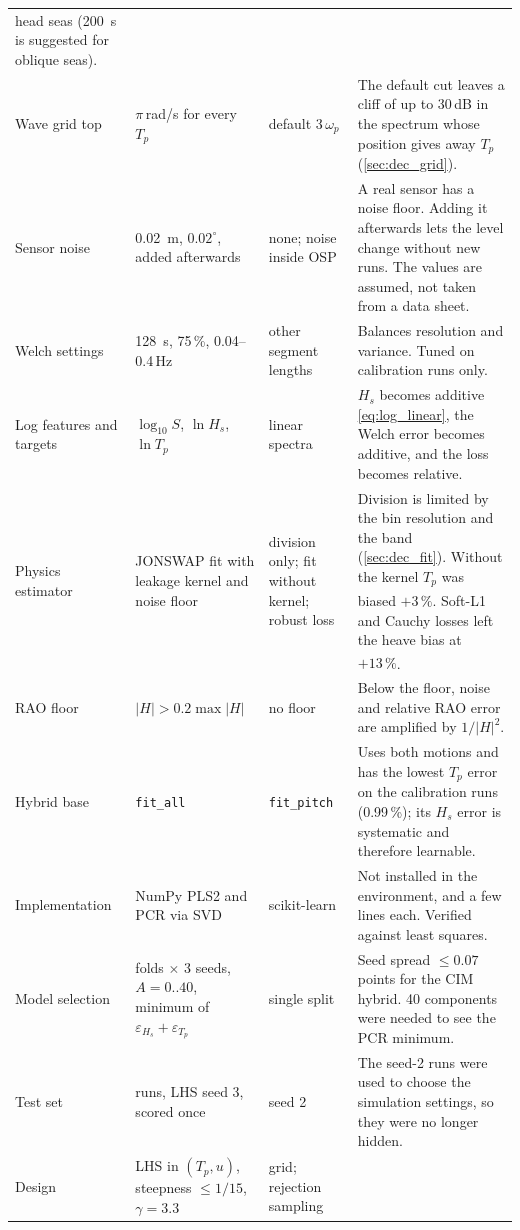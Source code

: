 \documentclass[11pt,a4paper]{article}
\newcommand{\Hs}{H_{s}}
\newcommand{\Tp}{T_{p}}
\newcommand{\pct}[1]{#1\,\%}
\newcommand{\dagnote}{\textsuperscript{\dag}}
\begin{document}
{\begin{longtable}{@{}>{\raggedright\arraybackslash}p{2.5cm}>{\raggedright\arraybackslash}p{3.4cm}>{\raggedright\arraybackslash}p{2.6cm}>{\raggedright\arraybackslash}p{6.4cm}@{}}
    head seas (\SI{200}{s} is suggested for oblique seas). \\
  Wave grid top & $\pi$\,rad/s for every $\Tp$ & default $3\,\omega_p$ &
    The default cut leaves a cliff of up to 30\,dB in the spectrum whose position gives away
    $\Tp$ (\cref{sec:dec_grid}). \\
  Sensor noise & \SI{0.02}{m}, $0.02^\circ$, added afterwards & none; noise inside OSP &
    A real sensor has a noise floor. Adding it afterwards lets the level change without new
    runs. The values are assumed, not taken from a data sheet. \\
  Welch settings & \SI{128}{s}, 75\,\%, 0.04--0.4\,Hz & other segment lengths &
    Balances resolution and variance. Tuned on calibration runs only. \\
  Log features and targets & $\log_{10} S$, $\ln\Hs$, $\ln\Tp$ & linear spectra &
    $\Hs$ becomes additive \cref{eq:log_linear}, the Welch error becomes additive, and the loss
    becomes relative. \\
  Physics estimator & JONSWAP fit with leakage kernel and noise floor & division only; fit
    without kernel; robust loss &
    Division is limited by the bin resolution and the band (\cref{sec:dec_fit}). Without the
    kernel $\Tp$ was biased $+\pct{3}$\dagnote. Soft-L1 and Cauchy losses left the heave bias at
    $+\pct{13}$\dagnote. \\
  RAO floor & $|H| > 0.2\max|H|$ & no floor &
    Below the floor, noise and relative RAO error are amplified by $1/|H|^2$. \\
  Hybrid base & \texttt{fit\_all} & \texttt{fit\_pitch} &
    Uses both motions and has the lowest $\Tp$ error on the calibration runs (\pct{0.99}); its
    $\Hs$ error is systematic and therefore learnable. \\
  Implementation & NumPy PLS2 and PCR via SVD & scikit-learn &
    Not installed in the environment, and a few lines each. Verified against least squares. \\
  Model selection & 5 folds $\times$ 3 seeds, $A = 0..40$, minimum of $\varepsilon_{\Hs} +
    \varepsilon_{\Tp}$ & single split & Seed spread $\le 0.07$ points for the CIM hybrid. 40
    components were needed to see the PCR minimum. \\
  Test set & 50 runs, LHS seed 3, scored once & seed 2 &
    The seed-2 runs were used to choose the simulation settings, so they were no longer hidden. \\
  Design & LHS in $(\Tp, u)$, steepness $\le 1/15$, $\gamma = 3.3$ & grid; rejection sampling &

\end{longtable}}
\end{document}
